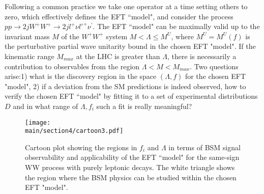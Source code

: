 \documentclass[../report.tex]{subfiles}
\providecommand{\main}{..}
\begin{document}
Following a common practice we take one operator at a time setting others to 
zero,  which effectively defines the EFT ``model", 
and consider   the process 
$pp\rightarrow 2jW^+ W^+ \rightarrow 2j l^+\nu l'^+\nu^\prime$. 
The EFT ``model" can be maximally valid up to the invariant mass $M$ of the 
$W^+W^+$ system 
$M<\Lambda\leq M^U$, where $M^U=M^U(f)$ is the perturbative partial wave unitarity bound  in the chosen EFT "model".  
If  the kinematic range $M_{max}$  at the LHC is greater than $\Lambda$, there is necessarily a 
contribution to observables from the region $\Lambda < M < M_{max}$.  
Two questions arise:1) what is the discovery region in the space $(\Lambda, f)$ for the chosen EFT "model", 2) if a deviation from  the SM predictions is indeed observed,
how to verify the chosen EFT  ``model"  by fitting it to a set of experimental distributions $D$ 
and in what range of $\Lambda, f_i$ such a fit is really meaningful?
%
%
\begin{figure}
\texttt{[image: \\main/section4/cartoon3.pdf]}
\caption{
Cartoon plot showing the regions in $f_i$ and $\Lambda$ in terms of BSM signal observability
and applicability of the EFT ``model"  for  the same-sign WW process with purely 
leptonic decays.  The white triangle shows the region
where the BSM physics can be studied within the chosen EFT "model".}
\label{fig:cartoonplot}
\end{figure}
%
\end{document}
